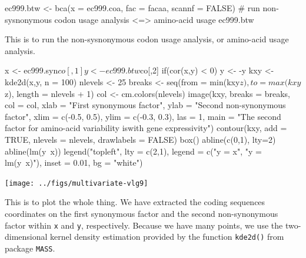 \documentclass{article}
\begin{document}
\begin{Schunk}
\begin{Sinput}
 ec999.btw <- bca(x = ec999.coa, fac  = facaa, scannf = FALSE) # run non-sysnonymous codon usage analysis <=> amino-acid usage
 ec999.btw
\end{Sinput}
\end{Schunk}

This is to run the non-sysnonymous codon usage analysis, or amino-acid usage analysis.

\begin{Schunk}
\begin{Sinput}
 x <- ec999.syn$co[,1] 
 y <- ec999.btw$co[,2]
 if(cor(x,y) < 0) y <- -y
 kxy <- kde2d(x,y, n = 100)
 nlevels <- 25
 breaks <- seq(from = min(kxy$z), to = max(kxy$z), length = nlevels + 1)
 col <- cm.colors(nlevels)
 image(kxy, breaks = breaks, col = col, xlab = "First synonymous factor",
 ylab = "Second non-synonymous factor", xlim = c(-0.5, 0.5),
 ylim  = c(-0.3, 0.3), las = 1,
 main = "The second factor for amino-acid variability is\ncorrelated with gene expressivity")
 contour(kxy, add = TRUE, nlevels = nlevels, drawlabels = FALSE)
 box()
 abline(c(0,1), lty=2)
 abline(lm(y~x))
 legend("topleft", lty = c(2,1), legend = c("y = x", "y = lm(y~x)"), inset = 0.01, bg = "white")
\end{Sinput}
\end{Schunk}
\texttt{[image: ../figs/multivariate-vlg9]}

This is to plot the whole thing. We have extracted the coding sequences coordinates
on the first synonymous factor and the second non-synonymous factor within
\texttt{x} and \texttt{y}, respectively. Because we have many points, we
use the two-dimensional kernel density estimation provided by the function
\texttt{kde2d()} from package \texttt{MASS}.
\end{document}
